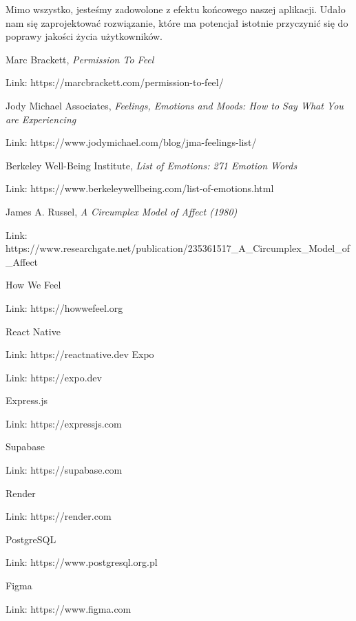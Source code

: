 \documentclass[inz, shortabstract]{iithesis}
\begin{document}
Mimo wszystko, jesteśmy zadowolone z efektu końcowego naszej aplikacji. Udało nam się zaprojektować rozwiązanie, które ma potencjał istotnie przyczynić się do poprawy jakości życia użytkowników.


\begin{thebibliography}{1}

\bibitem{} Marc Brackett, \textit{Permission To Feel}

Link: https://marcbrackett.com/permission-to-feel/

\bibitem{} Jody Michael Associates, \textit{Feelings, Emotions and Moods: How to Say What You are Experiencing}

Link: https://www.jodymichael.com/blog/jma-feelings-list/

\bibitem{} Berkeley Well-Being Institute, \textit{List of Emotions: 271 Emotion Words}

Link: https://www.berkeleywellbeing.com/list-of-emotions.html

\bibitem{} James A. Russel, \textit{A Circumplex Model of Affect (1980)}

Link: https://www.researchgate.net/publication/235361517\_A\_Circumplex\_Model\_of\_Affect

\bibitem{} How We Feel

Link: https://howwefeel.org

\bibitem{} React Native

Link: https://reactnative.dev
\bibitem{} Expo

Link: https://expo.dev

\bibitem{} Express.js

Link: https://expressjs.com

\bibitem{} Supabase

Link: https://supabase.com

\bibitem{} Render 

Link: https://render.com

\bibitem{} PostgreSQL

Link: https://www.postgresql.org.pl

\bibitem{} Figma

Link: https://www.figma.com

\end{thebibliography}
\end{document}
